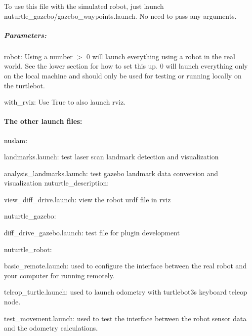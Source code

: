 To use this file with the simulated robot, just launch {\ttfamily nuturtle\+\_\+gazebo/gazebo\+\_\+waypoints.\+launch}. No need to pass any arguments.

\subparagraph*{Parameters\+:}


\begin{DoxyItemize}
\item robot\+: Using a number $>$ 0 will launch everything using a robot in the real world. See the lower section for how to set this up. 0 will launch everything only on the local machine and should only be used for testing or running locally on the turtlebot.
\item with\+\_\+rviz\+: Use True to also launch rviz.
\end{DoxyItemize}

\paragraph*{The other launch files\+:}

{\ttfamily nuslam}\+:
\begin{DoxyItemize}
\item {\ttfamily landmarks.\+launch}\+: test laser scan landmark detection and visualization
\item {\ttfamily analysis\+\_\+landmarks.\+launch}\+: test gazebo landmark data conversion and visualization {\ttfamily nuturtle\+\_\+description}\+:
\item {\ttfamily view\+\_\+diff\+\_\+drive.\+launch}\+: view the robot urdf file in rviz
\end{DoxyItemize}

{\ttfamily nuturtle\+\_\+gazebo}\+:
\begin{DoxyItemize}
\item {\ttfamily diff\+\_\+drive\+\_\+gazebo.\+launch}\+: test file for plugin development
\end{DoxyItemize}

{\ttfamily nuturtle\+\_\+robot}\+:
\begin{DoxyItemize}
\item {\ttfamily basic\+\_\+remote.\+launch}\+: used to configure the interface between the real robot and your computer for running remotely.
\item {\ttfamily teleop\+\_\+turtle.\+launch}\+: used to launch odometry with turtlebot3\textquotesingle{}s keyboard teleop node.
\item {\ttfamily test\+\_\+movement.\+launch}\+: used to test the interface between the robot sensor data and the odometry calculations.
\end{DoxyItemize}

